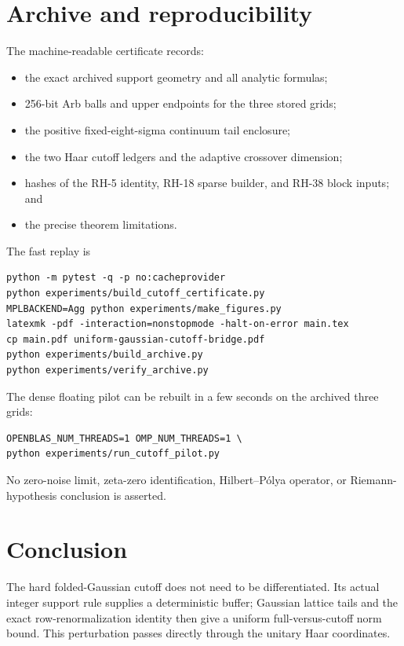 \documentclass[11pt]{article}
\theoremstyle{definition}
\theoremstyle{remark}
\begin{document}
\section{Archive and reproducibility}
\label{sec:archive}

The machine-readable certificate records:

\begin{itemize}[leftmargin=2em]
 \item the exact archived support geometry and all analytic formulas;
 \item 256-bit Arb balls and upper endpoints for the three stored grids;
 \item the positive fixed-eight-sigma continuum tail enclosure;
 \item the two Haar cutoff ledgers and the adaptive crossover dimension;
 \item hashes of the RH-5 identity, RH-18 sparse builder, and RH-38 block
       inputs; and
 \item the precise theorem limitations.
\end{itemize}

The fast replay is
\begin{verbatim}
python -m pytest -q -p no:cacheprovider
python experiments/build_cutoff_certificate.py
MPLBACKEND=Agg python experiments/make_figures.py
latexmk -pdf -interaction=nonstopmode -halt-on-error main.tex
cp main.pdf uniform-gaussian-cutoff-bridge.pdf
python experiments/build_archive.py
python experiments/verify_archive.py
\end{verbatim}

The dense floating pilot can be rebuilt in a few seconds on the archived
three grids:
\begin{verbatim}
OPENBLAS_NUM_THREADS=1 OMP_NUM_THREADS=1 \
python experiments/run_cutoff_pilot.py
\end{verbatim}

No zero-noise limit, zeta-zero identification, Hilbert--P\'olya operator, or
Riemann-hypothesis conclusion is asserted.

\section{Conclusion}

The hard folded-Gaussian cutoff does not need to be differentiated.  Its
actual integer support rule supplies a deterministic buffer; Gaussian lattice
tails and the exact row-renormalization identity then give a uniform
full-versus-cutoff norm bound.  This perturbation passes directly through the
unitary Haar coordinates.
\end{document}
